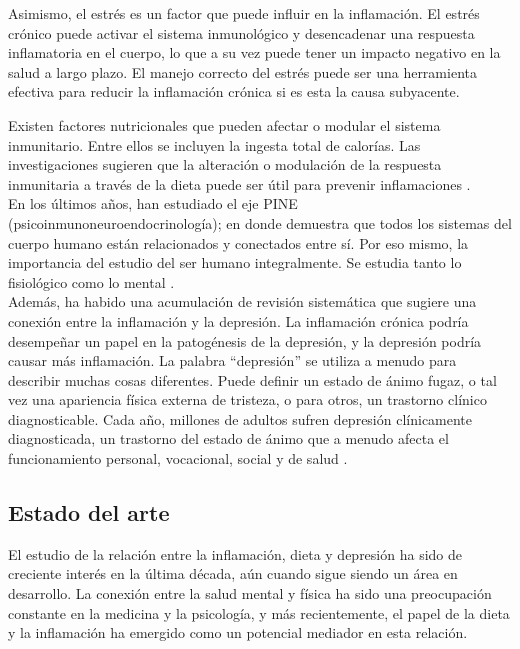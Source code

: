 \documentclass[stu, 12pt]{apa7}
\begin{document}
	Asimismo, el estrés es un factor que puede influir en la inflamación. El
	estrés crónico puede activar el sistema inmunológico y desencadenar una
	respuesta inflamatoria en el cuerpo, lo que a su vez puede tener un
	impacto negativo en la salud a largo plazo. El manejo correcto del
	estrés puede ser una herramienta efectiva para reducir la inflamación
	crónica si es esta la causa subyacente.

	Existen factores nutricionales que pueden afectar o modular el sistema
	inmunitario. Entre ellos se incluyen la ingesta total de calorías. Las
	investigaciones sugieren que la alteración o modulación de la respuesta
	inmunitaria a través de la dieta puede ser útil para prevenir
	inflamaciones \parencite{GarciaCasal2014}.\\

	En los últimos años, han estudiado el eje PINE
	(psicoinmunoneuroendocrinología); en donde demuestra que todos los
	sistemas del cuerpo humano están relacionados y conectados entre sí. Por
	eso mismo, la importancia del estudio del ser humano integralmente. Se
	estudia tanto lo fisiológico como lo mental \parencite{Osimo2019}.\\

	Además, ha habido una acumulación de revisión sistemática
	que sugiere una conexión entre la inflamación y la depresión. La
	inflamación crónica podría desempeñar un papel en la patogénesis de la
	depresión, y la depresión podría causar más inflamación. La palabra
	``depresión'' se utiliza a menudo para describir muchas cosas
	diferentes. Puede definir un estado de ánimo fugaz, o tal vez una
	apariencia física externa de tristeza, o para otros, un trastorno
	clínico diagnosticable. Cada año, millones de adultos sufren depresión
	clínicamente diagnosticada, un trastorno del estado de ánimo que a
	menudo afecta el funcionamiento personal, vocacional, social y de salud
	\parencite{APA2014}.

	\subsection{Estado del arte}

	El estudio de la relación entre la inflamación, dieta y depresión ha
	sido de creciente interés en la última década, aún cuando sigue siendo un área en
	desarrollo. La conexión entre la salud mental y física ha sido una
	preocupación constante en la medicina y la psicología, y más
	recientemente, el papel de la dieta y la inflamación ha emergido como un
	potencial mediador en esta relación.
\end{document}
